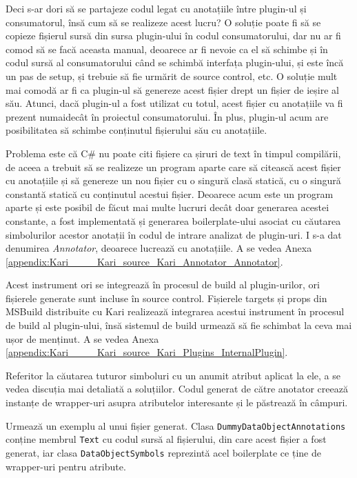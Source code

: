 \documentclass[a4paper,12pt]{report}
\begin{document}
Deci s-ar dori să se partajeze codul legat cu anotațiile între plugin-ul și consumatorul, însă cum să se realizeze acest lucru?
O soluție poate fi să se copieze fișierul sursă din sursa plugin-ului în codul consumatorului, dar nu ar fi comod să se facă aceasta manual, deoarece ar fi nevoie ca el să schimbe și în codul sursă al consumatorului când se schimbă interfața plugin-ului, și este încă un pas de setup, și trebuie să fie urmărit de source control, etc.
O soluție mult mai comodă ar fi ca plugin-ul să genereze acest fișier drept un fișier de ieșire al său.
Atunci, dacă plugin-ul a fost utilizat cu totul, acest fișier cu anotațiile va fi prezent numaidecât în proiectul consumatorului.
În plus, plugin-ul acum are posibilitatea să schimbe conținutul fișierului său cu anotațiile.

Problema este că C\# nu poate citi fișiere ca șiruri de text în timpul compilării, de aceea a trebuit să se realizeze un program aparte care să citească acest fișier cu anotațiile și să genereze un nou fișier cu o singură clasă statică, cu o singură constantă statică cu conținutul acestui fișier.
Deoarece acum este un program aparte și este posibil de făcut mai multe lucruri decât doar generarea acestei constante, a fost implementată și generarea boilerplate-ului asociat cu căutarea simbolurilor acestor anotații în codul de intrare analizat de plugin-uri.
I s-a dat denumirea \emph{Annotator}, deoarece lucrează cu anotațiile.
A se vedea Anexa \ref{appendix:Kari____Kari_source_Kari_Annotator_Annotator}.

Acest instrument ori se integrează în procesul de build al plugin-urilor, ori fișierele generate sunt incluse în source control.
Fișierele targets și props din MSBuild distribuite cu Kari realizează integrarea acestui instrument în procesul de build al plugin-ului,
însă sistemul de build urmează să fie schimbat la ceva mai ușor de menținut.
A se vedea Anexa \ref{appendix:Kari____Kari_source_Kari_Plugins_InternalPlugin}.


Referitor la căutarea tuturor simboluri cu un anumit atribut aplicat la ele, a se vedea discuția mai detaliată a soluțiilor.
Codul generat de către anotator creează instanțe de wrapper-uri asupra atributelor interesante și le păstrează în câmpuri.\cite{converting_attributes_roslyn}


Urmează un exemplu al unui fișier generat.
Clasa \texttt{DummyDataObjectAnnotations} conține membrul \texttt{Text} cu codul sursă al fișierului, din care acest fișier a fost generat,
iar clasa \texttt{DataObjectSymbols} reprezintă acel boilerplate ce ține de wrapper-uri pentru atribute.
\end{document}
